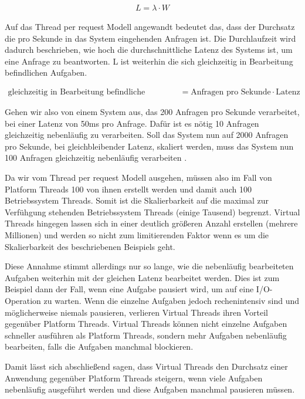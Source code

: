 \documentclass[fontsize=12pt,paper=a4,twoside=semi,parskip=half-,headsepline,headinclude]{scrreprt}
\begin{document}
\begin{eqnarray}
	L = \lambda \cdot W \nonumber
\end{eqnarray}

Auf das Thread per request Modell angewandt bedeutet das, dass der Durchsatz die pro Sekunde in das System eingehenden Anfragen ist. Die Durchlaufzeit wird dadurch beschrieben, wie hoch die durchschnittliche Latenz des Systems ist, um eine Anfrage zu beantworten. L ist weiterhin die sich gleichzeitig in Bearbeitung befindlichen Aufgaben.

\begin{align*}
	\text{gleichzeitig in Bearbeitung befindliche Aufgaben} &= 
	\text{Anfragen pro Sekunde} \cdot \text{Latenz}
\end{align*}

Gehen wir also von einem System aus, das 200 Anfragen pro Sekunde verarbeitet, bei einer Latenz von 50ms pro Anfrage. Dafür ist es nötig 10 Anfragen gleichzeitig nebenläufig zu verarbeiten. Soll das System nun auf 2000 Anfragen pro Sekunde, bei gleichbleibender Latenz, skaliert werden, muss das System nun 100  Anfragen gleichzeitig nebenläufig verarbeiten \cite{Pressler2023a}.

Da wir vom Thread per request Modell ausgehen, müssen also im Fall von  Platform Threads 100 von ihnen erstellt werden und damit auch 100 Betriebssystem Threads. Somit ist die Skalierbarkeit auf die maximal zur Verfühgung stehenden Betriebssystem Threads (einige Tausend) begrenzt. Virtual Threads hingegen lassen sich in einer deutlich größeren Anzahl erstellen (mehrere Millionen) und werden so nicht zum limitierenden Faktor wenn es um die Skalierbarkeit des beschriebenen Beispiels geht.

Diese Annahme stimmt allerdings nur so lange, wie die nebenläufig bearbeiteten Aufgaben weiterhin mit der gleichen Latenz bearbeitet werden. Dies ist zum Beispiel dann der Fall, wenn eine Aufgabe pausiert wird, um auf eine I/O-Operation zu warten. Wenn die einzelne Aufgaben jedoch rechenintensiv sind und möglicherweise niemals pausieren, verlieren Virtual Threads ihren Vorteil gegenüber Platform Threads. Virtual Threads können nicht einzelne Aufgaben schneller ausführen als Platform Threads, sondern mehr Aufgaben nebenläufig bearbeiten, falls die Aufgaben manchmal blockieren. 

Damit lässt sich abschließend sagen, dass Virtual Threads den Durchsatz einer Anwendung gegenüber Platform Threads steigern, wenn viele Aufgaben nebenläufig ausgeführt werden und diese Aufgaben manchmal pausieren müssen.
\end{document}
